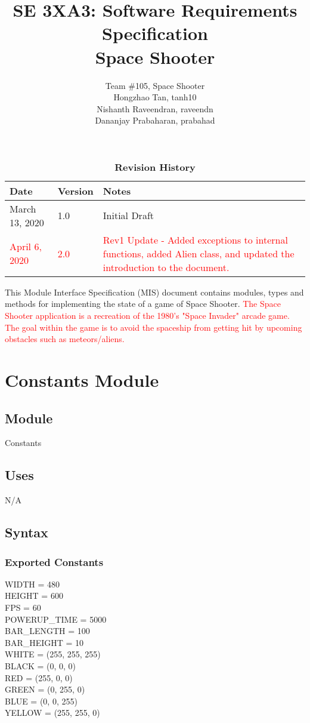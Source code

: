 \documentclass[12pt, titlepage]{article}
\title{SE 3XA3: Software Requirements Specification\\Space Shooter}
\author{Team \#105, Space Shooter
		\\ Hongzhao Tan, tanh10
		\\ Nishanth Raveendran, raveendn
		\\ Dananjay Prabaharan, prabahad}
\begin{document}
\maketitle

\begin{table}[bp]
\caption{\bf Revision History}
\begin{tabularx}{\textwidth}{p{3cm}p{2cm}X}
\toprule {\bf Date} & {\bf Version} & {\bf Notes}\\
\midrule
March 13, 2020 & 1.0 & Initial Draft\\
\textcolor{red}{April 6, 2020} & \textcolor{red}{2.0} & \textcolor{red}{Rev1 Update - Added exceptions to internal functions, added Alien class, and updated the introduction to the document.}\\
\bottomrule
\end{tabularx}
\end{table}
\FloatBarrier
\newpage

\newpage
This Module Interface Specification (MIS) document contains modules, types and methods for implementing the state of a game of Space Shooter. \textcolor{red}{The Space Shooter application is a recreation of the 1980's "Space Invader" arcade game. The goal within the game is to avoid the spaceship from getting hit by upcoming obstacles such as meteors/aliens.}



\section* {Constants Module}
\subsection*{Module}

Constants

\subsection* {Uses}

N/A

\subsection* {Syntax}

\subsubsection* {Exported Constants}
WIDTH = 480\\
HEIGHT = 600\\
FPS = 60\\
POWERUP\_TIME = 5000\\
BAR\_LENGTH = 100\\
BAR\_HEIGHT = 10\\
WHITE = (255, 255, 255)\\
BLACK = (0, 0, 0)\\
RED = (255, 0, 0)\\
GREEN = (0, 255, 0)\\
BLUE = (0, 0, 255)\\
YELLOW = (255, 255, 0)\\
\end{document}
